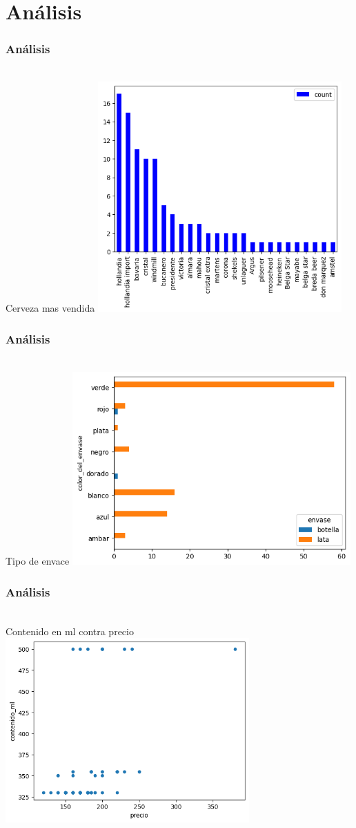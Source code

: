 \documentclass{beamer}
\begin{document}
\section{Análisis}
\begin{frame}
\frametitle{Análisis}\\Cerveza mas vendida
\includegraphics[width=0.7\textwidth]{Cerv_mas_vendida.png}
\end{frame}

\newpage
\begin{frame}
\frametitle{Análisis}\\Tipo de envace
\includegraphics[width=0.8\textwidth]{Cerv_tipo_de_envace.png}
\end{frame}

\newpage
\begin{frame}
\frametitle{Análisis}\\Contenido en ml contra precio
\includegraphics[width=0.7\textwidth]{Cerv_tipo_de_envace_precio.png}
\end{frame}
\end{document}
